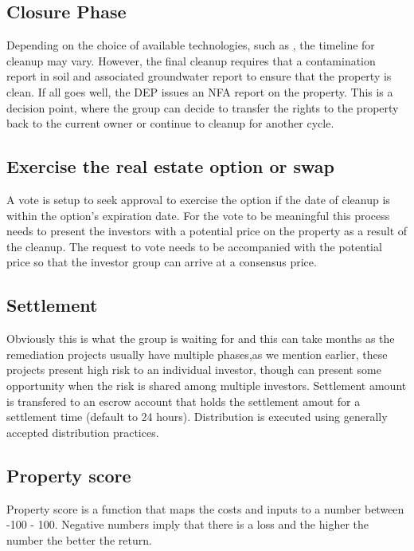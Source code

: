 \documentclass{article}
\begin{document}
  \subsection{Closure Phase} \label {closure}
  Depending on the choice of available technologies, such as \href{https://shop.sarvabioremed.com/collections/vaporremed}, the timeline for cleanup may vary. However, the final cleanup requires that a contamination report in soil and associated groundwater report to ensure that the property is clean. If all goes well, the DEP issues an NFA report on the property. This is a decision point, where the group can decide to transfer the rights to the property back to the current owner or continue to cleanup for another cycle. 

  \subsection{Exercise the real estate option or swap} \label {optionexercise}
  A vote is setup to seek approval to exercise the option if the date of cleanup is within the option's expiration date. For the vote to be meaningful this process needs to present the investors with a potential price on the property as a result of the cleanup. The request to vote needs to be accompanied with the potential price so that the investor group can arrive at a consensus price. 

  \subsection{Settlement} \label {settlement}
  Obviously this is what the group is waiting for and this can take months as the remediation projects usually have multiple phases,as we mention earlier, these projects present high risk to an individual investor, though can present some opportunity when the risk is shared among multiple investors. Settlement amount is transfered to an escrow account that holds the settlement amout for a settlement time (default to 24 hours). Distribution is executed using generally accepted distribution practices.

  \subsection {Property score} \label {propertyscore}  
  Property score is a function that maps the costs and inputs to a number between -100 - 100. Negative numbers imply that there is a loss and the higher the number the better the return.
\end{document}
